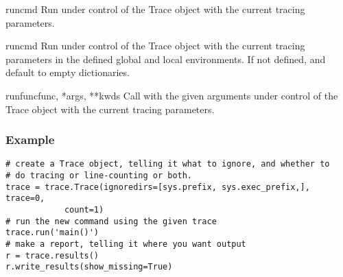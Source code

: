 \begin{methoddesc}[Trace]{run}{cmd}
Run  under control of the Trace object with the current tracing
parameters.
\end{methoddesc}

\begin{methoddesc}[Trace]{run}{cmd}
Run  under control of the Trace object with the current tracing
parameters in the defined global and local environments.  If not defined,
 and  default to empty dictionaries.
\end{methoddesc}

\begin{methoddesc}[Trace]{runfunc}{func, *args, **kwds}
Call  with the given arguments under control of the Trace
object with the current tracing parameters.
\end{methoddesc}

\subsubsection{Example}

\begin{verbatim}
# create a Trace object, telling it what to ignore, and whether to
# do tracing or line-counting or both.
trace = trace.Trace(ignoredirs=[sys.prefix, sys.exec_prefix,], trace=0,
		    count=1)
# run the new command using the given trace
trace.run('main()')
# make a report, telling it where you want output
r = trace.results()
r.write_results(show_missing=True)
\end{verbatim}
